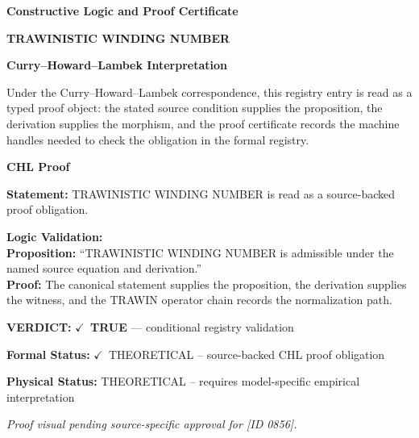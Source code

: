 \clearpage
\begingroup\tzpsupportsetup
\noindent\textbf{\fontsize{10.8pt}{12.8pt}\selectfont [ID 0856] Constructive Logic and Proof Certificate}\par
\noindent\textbf{\fontsize{10pt}{12pt}\selectfont TRAWINISTIC WINDING NUMBER}\par
\vspace{0.45em}
\begingroup
\footnotesize
\setlength{\parskip}{0.22em}
\setlength{\parindent}{0pt}
\noindent\textbf{Curry--Howard--Lambek Interpretation}\par
Under the Curry--Howard--Lambek correspondence, this registry entry is read as a typed proof
object: the stated source condition supplies the proposition, the derivation supplies the
morphism, and the proof certificate records the machine handles needed to check the obligation
in the formal registry.

\vspace{0.45em}
\noindent\textbf{CHL Proof}\par
\textbf{Statement:} TRAWINISTIC WINDING NUMBER is read as a source-backed proof obligation.

\textbf{Logic Validation:}\\
\textbf{Proposition:} ``TRAWINISTIC WINDING NUMBER is admissible under the named source equation and derivation.''\\
\textbf{Proof:} The canonical statement supplies the proposition, the derivation supplies the witness, and the TRAWIN operator chain records the normalization path.

\textbf{VERDICT:} \ensuremath{\checkmark}\ \textbf{TRUE} --- conditional registry validation

\textbf{Formal Status:} \ensuremath{\checkmark}\ THEORETICAL -- source-backed CHL proof obligation

\textbf{Physical Status:} THEORETICAL -- requires model-specific empirical interpretation
\par\vspace{0.45em}
\par
\vfill
\begingroup\footnotesize\itshape
Proof visual pending source-specific approval for [ID 0856].
\par\endgroup
\vfill
\endgroup
\endgroup

